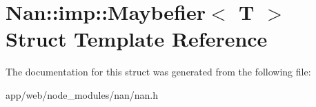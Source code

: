 \hypertarget{struct_nan_1_1imp_1_1_maybefier}{}\section{Nan\+:\+:imp\+:\+:Maybefier$<$ T $>$ Struct Template Reference}
\label{struct_nan_1_1imp_1_1_maybefier}


The documentation for this struct was generated from the following file\+:\begin{DoxyCompactItemize}
\item 
app/web/node\+\_\+modules/nan/nan.\+h\end{DoxyCompactItemize}

